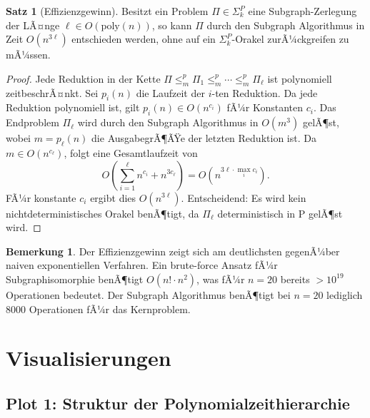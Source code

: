 ﻿\documentclass[a4paper,12pt]{article}
\theoremstyle{definition}
\newtheorem{satz}{Satz}
\newtheorem{bemerkung}{Bemerkung}
\begin{document}
\begin{satz}[Effizienzgewinn]
\label{satz:effizienz}
  Besitzt ein Problem $\Pi \in \Sigma_k^P$ eine Subgraph-Zerlegung
  der LÃ¤nge $\ell \in O(\mathrm{poly}(n))$, so kann $\Pi$ durch den
  Subgraph Algorithmus in Zeit $O(n^{3\ell})$ entschieden werden,
  ohne auf ein $\Sigma_k^P$-Orakel zurÃ¼ckgreifen zu mÃ¼ssen.
\end{satz}

\begin{proof}
  Jede Reduktion in der Kette $\Pi \leq_m^p \Pi_1 \leq_m^p \cdots \leq_m^p \Pi_\ell$
  ist polynomiell zeitbeschrÃ¤nkt. Sei $p_i(n)$ die Laufzeit der $i$-ten Reduktion.
  Da jede Reduktion polynomiell ist, gilt $p_i(n) \in O(n^{c_i})$ fÃ¼r Konstanten $c_i$.
  Das Endproblem $\Pi_\ell$ wird durch den Subgraph Algorithmus in $O(m^3)$ gelÃ¶st,
  wobei $m = p_\ell(n)$ die AusgabegrÃ¶ÃŸe der letzten Reduktion ist.
  Da $m \in O(n^{c_\ell})$, folgt eine Gesamtlaufzeit von
  \[
    O\!\left(\sum_{i=1}^{\ell} n^{c_i} + n^{3c_\ell}\right) = O(n^{3\ell \cdot \max_i c_i}).
  \]
  FÃ¼r konstante $c_i$ ergibt dies $O(n^{3\ell})$. Entscheidend: Es wird kein
  nichtdeterministisches Orakel benÃ¶tigt, da $\Pi_\ell$ deterministisch in P gelÃ¶st wird.
\end{proof}

\begin{bemerkung}
  Der Effizienzgewinn zeigt sich am deutlichsten gegenÃ¼ber naiven exponentiellen
  Verfahren. Ein brute-force Ansatz fÃ¼r Subgraphisomorphie benÃ¶tigt $O(n! \cdot n^2)$,
  was fÃ¼r $n = 20$ bereits $> 10^{19}$ Operationen bedeutet.
  Der Subgraph Algorithmus benÃ¶tigt bei $n = 20$ lediglich $8000$ Operationen
  fÃ¼r das Kernproblem.
\end{bemerkung}

\section{Visualisierungen}

\subsection{Plot 1: Struktur der Polynomialzeithierarchie}
\label{sec:plot1}
\end{document}
